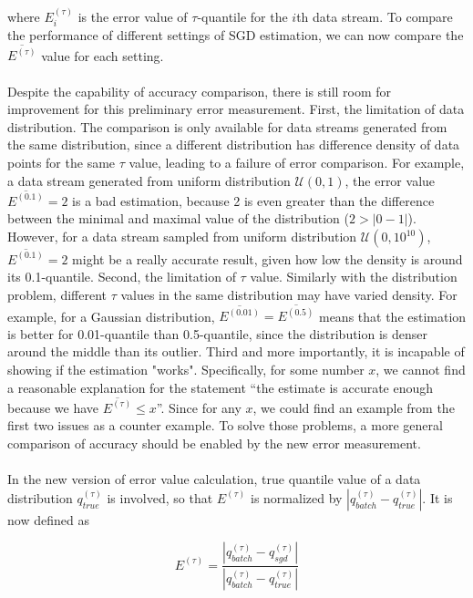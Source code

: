     
where $E^{(\tau)}_{i}$ is the error value of $\tau$-quantile for the $i$th data stream. To compare the performance of different settings of SGD estimation, we can now compare the $\overline{E^{(\tau)}}$ value for each setting.
\\\\
 Despite the capability of accuracy comparison, there is still room for improvement for this preliminary error measurement. 
 First, the limitation of data distribution. The comparison is only available for data streams generated from the same distribution, since a different distribution has difference density of data points for the same $\tau$ value, leading to a failure of error comparison. For example, a data stream generated from uniform distribution $\mathcal{U}(0,1)$, the error value $\overline{E^{(0.1)}} = 2$ is a bad estimation, because 2 is even greater than the difference between the minimal and maximal value of the distribution ($2 > |0-1|$). However, for a data stream sampled from uniform distribution $\mathcal{U}(0,10^{10})$, $\overline{E^{(0.1)}} = 2$ might be a really accurate result, given how low the density is around its 0.1-quantile. 
 Second, the limitation of $\tau$ value. Similarly with the distribution problem, different $\tau$ values in the same distribution may have varied density. For example, for a Gaussian distribution, $\overline{E^{(0.01)}} = \overline{E^{(0.5)}}$ means that the estimation is better for 0.01-quantile than 0.5-quantile, since the distribution is denser around the middle than its outlier.
 Third and more importantly, it is incapable of showing if the estimation "works". Specifically, for some number $x$, we cannot find a reasonable explanation for the statement ``the estimate is accurate enough because we have $\overline{E^{(\tau)}} \leq x$''. Since for any $x$, we could find an example from the first two issues as a counter example. To solve those problems, a more general comparison of accuracy should be enabled by the new error measurement.
\\\\
In the new version of error value calculation, true quantile value of a data distribution $q_{true}^{(\tau)}$ is involved, so that $E^{(\tau)}$ is normalized by $|q_{batch}^{(\tau)} - q_{true}^{(\tau)}|$. It is now defined as

\begin{equation}
    E^{(\tau)} = \frac{|q_{batch}^{(\tau)} - q_{sgd}^{(\tau)}|}
                      {|q_{batch}^{(\tau)} - q_{true}^{(\tau)}|}
\end{equation}
    

